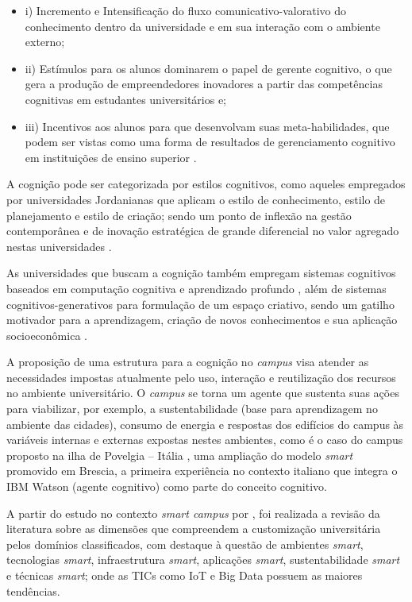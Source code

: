 \documentclass[portuguese]{textolivre}
\begin{document}
\begin{itemize}
    \item i) Incremento e Intensificação do fluxo comunicativo-valorativo do conhecimento dentro da universidade e em sua interação com o ambiente externo;
    \item ii) Estímulos para os alunos dominarem o papel de gerente cognitivo, o que gera a produção de empreendedores inovadores a partir das competências cognitivas em estudantes universitários \cite{jimenez2019} e; 
    \item iii) Incentivos aos alunos para que desenvolvam suas meta-habilidades, que podem ser vistas como uma forma de resultados de gerenciamento cognitivo em instituições de ensino superior \cite{belyaev2019}.
\end{itemize}

A cognição pode ser categorizada por estilos cognitivos, como aqueles empregados por universidades Jordanianas que aplicam o estilo de conhecimento, estilo de planejamento e estilo de criação; sendo um ponto de inflexão na gestão contemporânea e de inovação estratégica de grande diferencial no valor agregado nestas universidades \cite{Alnazer2017}.

As universidades que buscam a cognição também empregam sistemas cognitivos baseados em computação cognitiva e aprendizado profundo \cite{golovianko2017}, além de sistemas cognitivos-generativos para formulação de um espaço criativo, sendo um gatilho motivador para a aprendizagem, criação de novos conhecimentos e sua aplicação socioeconômica \cite{karpov2018}.

A proposição de uma estrutura para a cognição no \textit{campus} visa atender as necessidades impostas atualmente pelo uso, interação e reutilização dos recursos no ambiente universitário. O \textit{campus} se torna um agente que sustenta suas ações para viabilizar, por exemplo, a sustentabilidade (base para aprendizagem no ambiente das cidades), consumo de energia e respostas dos edifícios do campus às variáveis internas e externas expostas nestes ambientes, como é o caso do campus proposto na ilha de Povelgia – Itália \cite{bittenbinder2020}, uma ampliação do modelo \textit{smart} promovido em Brescia, a primeira experiência no contexto italiano que integra o IBM Watson (agente cognitivo) como parte do conceito cognitivo.

A partir do estudo no contexto \textit{smart campus} por \textcite{giuriatti2023}, foi realizada a revisão da literatura sobre as dimensões que compreendem a customização universitária pelos domínios classificados, com destaque à questão de ambientes \textit{smart}, tecnologias \textit{smart}, infraestrutura \textit{smart}, aplicações \textit{smart}, sustentabilidade \textit{smart} e técnicas \textit{smart}; onde as TICs como IoT e Big Data possuem as maiores tendências.
\end{document}
